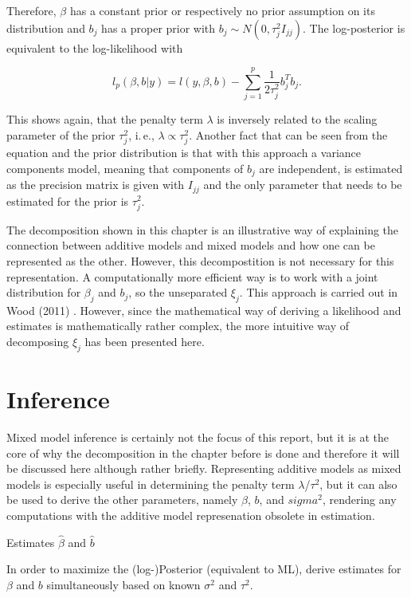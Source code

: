 \documentclass[12pt]{article}
\begin{document}
Therefore, $\beta$ has a constant prior or respectively no prior assumption on its distribution and $b_j$ has a proper prior with $b_j \sim N(0,\tau_j^2I_{jj})$. The log-posterior is equivalent to the log-likelihood with

$$l_p(\beta,b|y) = l(y,\beta,b) - \sum_{j=1}^p \frac{1}{2\tau_j^2} b_j^T  b_j. $$

This shows again, that the penalty term $\lambda$ is inversely related to the scaling parameter of the prior $\tau^2_j$, i.\,e., $\lambda \propto \tau_j^2$. Another fact that can be seen from the equation and the prior distribution is that with this approach a variance components model, meaning that components of $b_j$ are independent, is estimated as the precision matrix is given with $I_{jj}$ and the only parameter that needs to be estimated for the prior is $\tau^2_j$.

The decomposition shown in this chapter is an illustrative way of explaining the connection between additive models and mixed models and how one can be represented as the other. However, this decompostition is not necessary for this representation. A computationally more efficient way is to work with a joint distribution for $\beta_j$ and $b_j$, so the unseparated $\xi_j$. This approach is carried out in Wood (2011) \cite{wood2011fast}. However, since the mathematical way of deriving a likelihood and estimates is mathematically rather complex, the more intuitive way of decomposing $\xi_j$ has been presented here.







\section{Inference} %

Mixed model inference is certainly not the focus of this report, but it is at the core of why the decomposition in the chapter before is done and therefore it will be discussed here although rather briefly. Representing additive models as mixed models is especially useful in determining the penalty term $\lambda$/$\tau^2$, but it can also be used to derive the other parameters, namely $\beta$, $b$, and $sigma^2$, rendering any computations with the additive model represenation obsolete in estimation. 

Estimates $\hat{\beta}$ and $\hat{b}$

In order to maximize the (log-)Posterior (equivalent to ML), derive estimates for $\beta$ and $b$ simultaneously based on known $\sigma^2$ and $\tau^2$.
\end{document}
